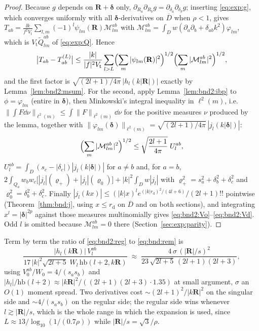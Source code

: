 \begin{proof}
Because $g$ depends on $\mathbf{R}+\boldsymbol{\delta}$ only,
$\partial_{R_a}\partial_{R_b}g = \partial_{\delta_a}\partial_{\delta_b}g$; inserting
\eqref{eq:exp:g}, which converges uniformly with all $\boldsymbol{\delta}$-derivatives on
$\overline{D}$ when $\rho<1$, gives
$T_{ab} = \frac{\ii k}{f^2V_{\mathrm{t}}}\sum_{l,m}(-1)^l\psi_{lm}(\mathbf{R})
\mathcal{M}^{ab}_{lm}$ with $\mathcal{M}^{ab}_{lm} = \int_D w(\partial_a\partial_b +
\delta_{ab}k^2)\varphi_{lm}$, which is $V_{\mathrm{t}}\widetilde{Q}^{ab}_{lm}$ of
\eqref{eq:exp:Q}. Hence
\[
\bigl|T_{ab}-T^{(L)}_{ab}\bigr| \le \frac{|k|}{|f|^2V_{\mathrm{t}}}\sum_{l>L}
\Bigl(\sum_m|\psi_{lm}(\mathbf{R})|^2\Bigr)^{1/2}
\Bigl(\sum_m|\mathcal{M}^{ab}_{lm}|^2\Bigr)^{1/2},
\]
and the first factor is $\sqrt{(2l+1)/4\pi}\,|h_l(k|\mathbf{R}|)|$ exactly by
Lemma~\ref{lem:bnd2:msum}. For the second, apply Lemma~\ref{lem:bnd2:ibp} to
$\phi = \varphi_{lm}$ (entire in $\boldsymbol{\delta}$), then Minkowski's integral
inequality in $\ell^2(m)$, i.e.\
$\|\int F\dd\nu\|_{\ell^2(m)} \le \int\|F\|_{\ell^2(m)}\dd\nu$ for the positive measures
$\nu$ produced by the lemma, together with
$\|\varphi_{lm}(\boldsymbol{\delta})\|_{\ell^2(m)} =
\sqrt{(2l+1)/4\pi}\,|j_l(k|\boldsymbol{\delta}|)|$:
\[
\Bigl(\sum_m|\mathcal{M}^{ab}_{lm}|^2\Bigr)^{1/2} \le
\sqrt{\frac{2l+1}{4\pi}}\;U^{ab}_l,
\]
$U^{ab}_l = \int_D(s_c-|\delta_c|)|j_l(k|\boldsymbol{\delta}|)|$ for $a\neq b$ and, for
$a=b$, $2\int_{Q_a}w_bw_c\bigl[|j_l|(\varrho_+) + |j_l|(\varrho_0)\bigr] +
|k|^2\int_Dw|j_l|$ with $\varrho_+^2 = s_a^2+\delta_b^2+\delta_c^2$ and
$\varrho_0^2 = \delta_b^2+\delta_c^2$. Finally
$|j_l(kx)| \le (|k|x)^le^{(|k|r_{\mathrm{d}})^2/(4l+6)}/(2l+1)!!$ pointwise
(Theorem~\ref{thm:bnd:j}, using $x \le r_{\mathrm{d}}$ on $\overline{D}$ and on both
sections), and integrating $x^l = |\boldsymbol{\delta}|^{2p}$ against those measures
multinomially gives \eqref{eq:bnd2:Vo}--\eqref{eq:bnd2:Vd}. Odd $l$ is omitted because
$\mathcal{M}^{ab}_{lm} = 0$ there (Section~\ref{sec:exp:parity}).
\end{proof}

\begin{remark}
\label{rem:bnd2:why}
Term by term the ratio of \eqref{eq:bnd2:reg} to \eqref{eq:bnd:rem} is
\[
\frac{|h_l(k\mathbf{R})|\,V^{ab}_l}
{17\,|k|^2\sqrt{2l+5}\;W_l\,\mathrm{hb}(l+2,k\mathbf{R})}
\;\approx\;
\frac{4\,\sigma\,(|\mathbf{R}|/s)^2}{23\,\sqrt{2l+5}\,(2l+1)(2l+3)},
\]
using $V^{ab}_0/W_0 = 4/(s_as_b)$ and $|h_l|/\mathrm{hb}(l+2)\approx
|k\mathbf{R}|^2/((2l+1)(2l+3)\cdot 1.35)$ at small argument, $\sigma$ an $O(1)$ moment
spread. Two derivatives cost $\sim(2l+1)^2/|k\mathbf{R}|^2$ on the singular side and
$\sim 4/(s_as_b)$ on the regular side; the regular side wins whenever $l \gtrsim
|\mathbf{R}|/s$, which is the whole range in which the expansion is used, since
$L \approx 13/\log_{10}(1/(0.7\rho))$ while $|\mathbf{R}|/s = \sqrt3/\rho$.
\end{remark}

